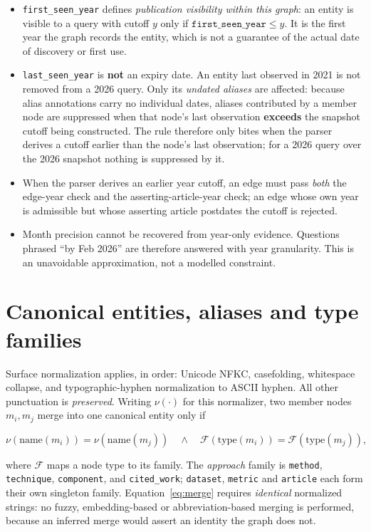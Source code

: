 \documentclass[11pt,a4paper]{article}
\begin{document}
\begin{itemize}
\item \texttt{first\_seen\_year} defines \emph{publication visibility within this graph}: an entity is
visible to a query with cutoff $y$ only if $\texttt{first\_seen\_year} \le y$. It is the first year the
graph records the entity, which is not a guarantee of the actual date of discovery or first use.
\item \texttt{last\_seen\_year} is \textbf{not} an expiry date. An entity last observed in 2021 is not
removed from a 2026 query. Only its \emph{undated aliases} are affected: because alias annotations carry no
individual dates, aliases contributed by a member node are suppressed when that node's last observation
\textbf{exceeds} the snapshot cutoff being constructed. The rule therefore only bites when the parser
derives a cutoff earlier than the node's last observation; for a 2026 query over the 2026 snapshot nothing
is suppressed by it.
\item When the parser derives an earlier year cutoff, an edge must pass \emph{both} the edge-year check and
the asserting-article-year check; an edge whose own year is admissible but whose asserting article postdates
the cutoff is rejected.
\item Month precision cannot be recovered from year-only evidence. Questions phrased ``by Feb 2026'' are
therefore answered with year granularity. This is an unavoidable approximation, not a modelled constraint.
\end{itemize}

\section{Canonical entities, aliases and type families}

Surface normalization applies, in order: Unicode NFKC, casefolding, whitespace collapse, and
typographic-hyphen normalization to ASCII hyphen. All other punctuation is \emph{preserved}. Writing
$\nu(\cdot)$ for this normalizer, two member nodes $m_i, m_j$ merge into one canonical entity only if

\begin{equation}
\nu(\text{name}(m_i)) = \nu(\text{name}(m_j))
\quad\wedge\quad
\mathcal{F}(\text{type}(m_i)) = \mathcal{F}(\text{type}(m_j)),
\label{eq:merge}
\end{equation}

where $\mathcal{F}$ maps a node type to its family. The \emph{approach} family is
\texttt{method}, \texttt{technique}, \texttt{component}, and \texttt{cited\_work}; \texttt{dataset},
\texttt{metric} and \texttt{article} each form their own singleton family. Equation~\eqref{eq:merge}
requires \emph{identical} normalized strings: no fuzzy, embedding-based or abbreviation-based merging is
performed, because an inferred merge would assert an identity the graph does not.
\end{document}
